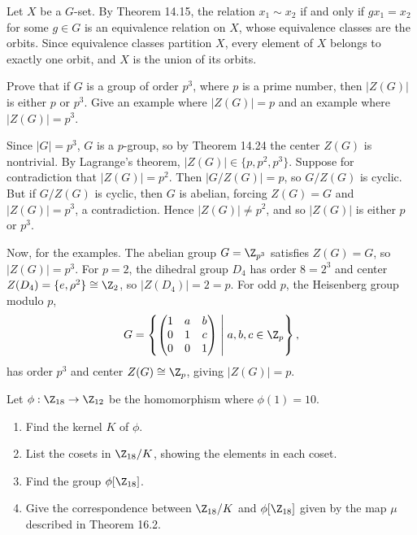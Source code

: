 \begin{solution}[(ii)]
  Let $X$ be a $G$-set. By Theorem 14.15, the relation $x_1 \sim x_2$ if and only if $gx_1 = x_2$ for some $g \in G$ is an equivalence relation on $X$, whose equivalence classes are the orbits. Since equivalence classes partition $X$, every element of $X$ belongs to exactly one orbit, and $X$ is the union of its orbits.
\end{solution}

\begin{problem}[14.29]
  Prove that if $G$ is a group of order $p^3$, where $p$ is a prime number, then $|Z(G)|$ is either $p$ or $p^3$. Give an example where $|Z(G)| = p$ and an example where $|Z(G)| = p^3$.
\end{problem}

\begin{solution}
  Since $|G| = p^3$, $G$ is a $p$-group, so by Theorem 14.24 the center $Z(G)$ is nontrivial. By Lagrange's theorem, $|Z(G)| \in \{p, p^2, p^3\}$. Suppose for contradiction that $|Z(G)| = p^2$. Then $|G/Z(G)| = p$, so $G/Z(G)$ is cyclic. But if $G/Z(G)$ is cyclic, then $G$ is abelian, forcing $Z(G) = G$ and $|Z(G)| = p^3$, a contradiction. Hence $|Z(G)| \neq p^2$, and so $|Z(G)|$ is either $p$ or $p^3$.

  Now, for the examples. The abelian group $G = \Z_{p^3}$ satisfies $Z(G) = G$, so $|Z(G)| = p^3$. For $p = 2$, the dihedral group $D_4$ has order $8 = 2^3$ and center $Z(D_4) = \{e, \rho^2\} \cong \Z_2$, so $|Z(D_4)| = 2 = p$. For odd $p$, the Heisenberg group modulo $p$,
  \[%
    G = \left\{ \begin{pmatrix} 1 & a & b \\ 0 & 1 & c \\ 0 & 0 & 1 \end{pmatrix} \;\middle|\; a, b, c \in \Z_p \right\}
  ,\]%
  has order $p^3$ and center $Z(G) \cong \Z_p$, giving $|Z(G)| = p$.
\end{solution}

\begin{problem}[16.2]
  Let $\phi : \Z_{18} \to \Z_{12}$ be the homomorphism where $\phi(1) = 10$.
  \begin{enumerate}
    \item Find the kernel $K$ of $\phi$.
    \item List the cosets in $\Z_{18}/K$, showing the elements in each coset.
    \item Find the group $\phi[\Z_{18}]$.
    \item Give the correspondence between $\Z_{18}/K$ and $\phi[\Z_{18}]$ given by the map $\mu$ described in Theorem 16.2.
  \end{enumerate}
\end{problem}

